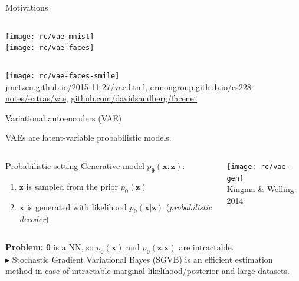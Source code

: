 \documentclass[handout]{beamer}
\begin{document}
  \begin{frame}{Motivations}

    \begin{columns}[T,onlytextwidth]
      \centering
      \texttt{[image: rc/vae-mnist]}\\

      \centering
      \texttt{[image: rc/vae-faces]}\\
    \end{columns}
    
    \centering
    \texttt{[image: rc/vae-faces-smile]}\\
    \tiny{\url{jmetzen.github.io/2015-11-27/vae.html}, \url{ermongroup.github.io/cs228-notes/extras/vae}, \url{github.com/davidsandberg/facenet}}

  \end{frame}

  \begin{frame}{Variational autoencoders (VAE)}


    VAEs are \alert{latent-variable probabilistic models}.
    \pause
    \begin{columns}[T,onlytextwidth]

      \begin{block}{Probabilistic setting}
        Generative model $p_{\boldsymbol{\theta}}(\mathbf{x}, \mathbf{z})$:
        \begin{enumerate}
          \item $\mathbf{z}$ is sampled from the \alert{prior} $p_{\boldsymbol{\theta}}(\mathbf{z})$
          \item $\mathbf{x}$ is generated with \alert{likelihood} $p_{\boldsymbol{\theta}}(\mathbf{x}|\mathbf{z})$ (\emph{probabilistic decoder})
        \end{enumerate}
      \end{block}

      \centering
      \texttt{[image: rc/vae-gen]}\\
      \tiny{Kingma \& Welling 2014 \cite{Kingma2014}}
      
    \end{columns}
    \vspace{0.5cm}
    \pause
    \textbf{Problem:} $\boldsymbol{\theta}$ is a NN, so $p_{\boldsymbol{\theta}}(\mathbf{x})$ and $p_{\boldsymbol{\theta}}(\mathbf{z}|\mathbf{x})$ are intractable.\\
    \pause
    $\blacktriangleright$ Stochastic Gradient Variational Bayes (SGVB) \cite{Kingma2014} is an efficient estimation method in case of intractable marginal likelihood/posterior and large datasets.

  \end{frame}
\end{document}
